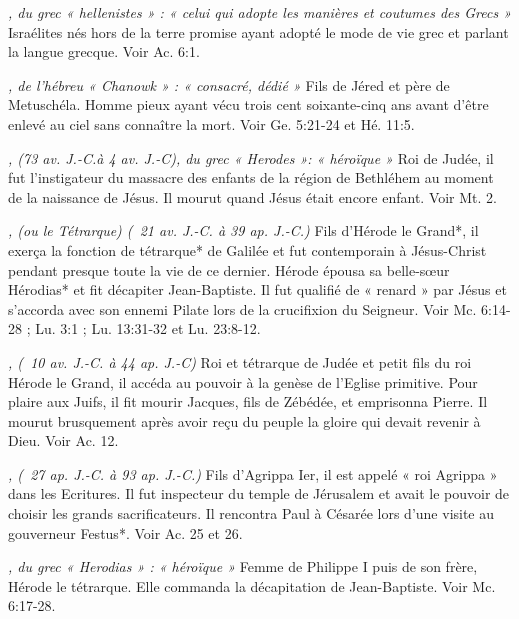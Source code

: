\begin{multicols}{2}
\textit{, du grec « hellenistes » : « celui qui adopte les manières et coutumes des Grecs »}\newline
Israélites nés hors de la terre promise ayant adopté le mode de vie grec et parlant la langue grecque. Voir Ac. 6:1.

\textit{, de l'hébreu « Chanowk » : « consacré, dédié »}\newline
Fils de Jéred et père de Metuschéla. Homme pieux ayant vécu trois cent soixante-cinq ans avant d'être enlevé au ciel sans connaître la mort. Voir Ge. 5:21-24 et Hé. 11:5.

\textit{, (73 av. J.-C.à 4 av. J.-C), du grec « Herodes »: « héroïque »}\newline
Roi de Judée, il fut l'instigateur du massacre des enfants de la région de Bethléhem au moment de la naissance de Jésus. Il mourut quand Jésus était encore enfant. Voir Mt. 2.

\textit{, (ou le Tétrarque) (\ 21 av. J.-C. à 39 ap. J.-C.)}\newline
Fils d'Hérode le Grand*, il exerça la fonction de tétrarque* de Galilée et fut contemporain à Jésus-Christ pendant presque toute la vie de ce dernier. Hérode épousa sa belle-sœur Hérodias* et fit décapiter Jean-Baptiste. Il fut qualifié de « renard » par Jésus et s'accorda avec son ennemi Pilate lors de la crucifixion du Seigneur. Voir Mc. 6:14-28 ; Lu. 3:1 ; Lu. 13:31-32 et Lu. 23:8-12.

\textit{, (\ 10 av. J.-C. à 44 ap. J.-C)}\newline
Roi et tétrarque de Judée et petit fils du roi Hérode le Grand, il accéda au pouvoir à la genèse de l'Eglise primitive. Pour plaire aux Juifs, il fit mourir Jacques, fils de Zébédée, et emprisonna Pierre. Il mourut brusquement après avoir reçu du peuple la gloire qui devait revenir à Dieu. Voir Ac. 12.

\textit{, (\ 27 ap. J.-C. à 93 ap. J.-C.)}\newline
Fils d'Agrippa Ier, il est appelé « roi Agrippa » dans les Ecritures. Il fut inspecteur du temple de Jérusalem et avait le pouvoir de choisir les grands sacrificateurs. Il rencontra Paul à Césarée lors d'une visite au gouverneur Festus*. Voir Ac. 25 et 26.

\textit{, du grec « Herodias » : « héroïque »}\newline
Femme de Philippe I puis de son frère, Hérode le tétrarque. Elle commanda la décapitation de Jean-Baptiste. Voir Mc. 6:17-28.


\end{multicols}
